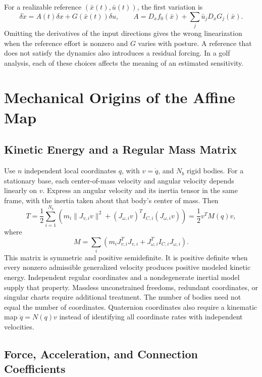 For a realizable reference $(\bar x(t),\bar u(t))$, the first variation is
\begin{equation}
\delta\dot x=A(t)\delta x+G(\bar x(t))\delta u,
\qquad A=D_x f_0(\bar x)+\sum_j\bar u_jD_xG_j(\bar x).
\end{equation}
Omitting the derivatives of the input directions gives the wrong linearization when the reference effort is nonzero and $G$ varies with posture. A reference that does not satisfy the dynamics also introduces a residual forcing. In a golf analysis, each of these choices affects the meaning of an estimated sensitivity.

\section{Mechanical Origins of the Affine Map}
\label{sec:ch3:control-affine}

\subsection{Kinetic Energy and a Regular Mass Matrix}

Use $n$ independent local coordinates $q$, with $v=\dot q$, and $N_b$ rigid bodies. For a stationary base, each center-of-mass velocity and angular velocity depends linearly on $v$. Express an angular velocity and its inertia tensor in the same frame, with the inertia taken about that body's center of mass. Then
\begin{equation}
T=\frac12\sum_{i=1}^{N_b}\left(m_i\|J_{v,i}v\|^2+
 (J_{\omega,i}v)^TI_{C,i}(J_{\omega,i}v)\right)
 =\frac12v^TM(q)v,
\label{eq:ch3:kinetic-energy}
\end{equation}
where
\begin{equation}
M=\sum_i\left(m_iJ_{v,i}^TJ_{v,i}+J_{\omega,i}^TI_{C,i}J_{\omega,i}\right).
\label{eq:ch3:mass-matrix-explicit}
\end{equation}
This matrix is symmetric and positive semidefinite. It is positive definite when every nonzero admissible generalized velocity produces positive modeled kinetic energy. Independent regular coordinates and a nondegenerate inertial model supply that property. Massless unconstrained freedoms, redundant coordinates, or singular charts require additional treatment. The number of bodies need not equal the number of coordinates. Quaternion coordinates also require a kinematic map $\dot q=N(q)v$ instead of identifying all coordinate rates with independent velocities.

\subsection{Force, Acceleration, and Connection Coefficients}

